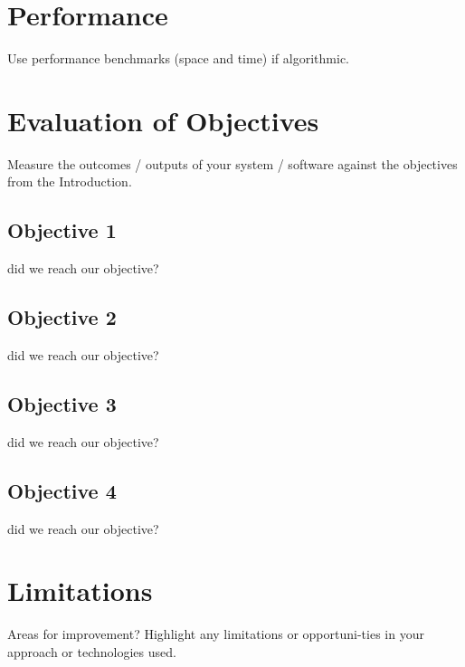 \section{Performance}
Use performance benchmarks (space and time) if algorithmic.

\section{Evaluation of Objectives}
Measure the outcomes / outputs of your system / software against the objectives from the Introduction.
\subsection{Objective 1}
did we reach our objective?

\subsection{Objective 2}
did we reach our objective?

\subsection{Objective 3}
did we reach our objective?

\subsection{Objective 4}
did we reach our objective?

\section{Limitations}
Areas for improvement?
Highlight any limitations or opportuni-ties in your approach or technologies used.